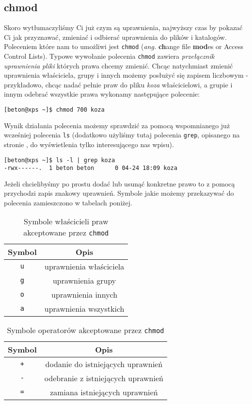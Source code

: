 \subsection{chmod}
\label{sec:chmod}
Skoro wytłumaczyliśmy Ci już czym są uprawnienia, najwyższy czas by pokazać Ci jak przyznawać, zmieniać i odbierać uprawnienia do plików i katalogów. Poleceniem które nam to umożliwi jest \texttt{chmod} (\textit{ang.} \textbf{ch}ange file \textbf{mod}es or Access Control Lists). Typowe wywołanie polecenia \texttt{chmod} zawiera \textit{przełącznik} \textit{uprawnienia} \textit{pliki} których prawa chcemy zmienić. Chcąc natychmiast zmienić uprawnienia właściciela, grupy i innych możemy posłużyć się zapisem liczbowym - przykładowo, chcąc nadać pełnie praw do pliku \textit{koza} właścicielowi, a grupie i innym odebrać wszystkie prawa wykonamy następujące polecenie:
\begin{verbatim}
[beton@xps ~]$ chmod 700 koza
\end{verbatim}
Wynik działania polecenia możemy sprawdzić za pomocą wspomnianego już wcześniej polecenia \texttt{ls} (dodatkowo użyliśmy tutaj polecenia \texttt{grep}, opisanego na stronie \pageref{sec:grep}, do wyświetlenia tylko interesującego nas wpisu).
\begin{verbatim}
[beton@xps ~]$ ls -l | grep koza
-rwx------.  1 beton beton      0 04-24 18:09 koza
\end{verbatim}
Jeżeli chcielibyśmy po prostu dodać lub usunąć konkretne prawo to z pomocą przychodzi zapis znakowy uprawnień. Symbole jakie możemy przekazywać do polecenia zamieszczono w tabelach poniżej.
\begin{table}[h!t!b]
\begin{center}
\begin{tabular}{|c|c|} \hline
Symbol & Opis \\ \hline
\texttt{u} & uprawnienia właściciela \\ \hline
\texttt{g} & uprawnienia grupy \\ \hline
\texttt{o} & uprawnienia innych \\ \hline
\texttt{a} & uprawnienia wszystkich \\ \hline
\end{tabular}
\caption{Symbole właścicieli praw akceptowane przez \texttt{chmod}}
\label{tab:chmod_symbole_wlasciciele}
\end{center}
\end{table}

\begin{table}[h!t!b]
\begin{center}
\begin{tabular}{|c|c|} \hline
Symbol & Opis \\ \hline
\texttt{+} & dodanie do istniejących uprawnień \\ \hline
\texttt{-} & odebranie z istniejących uprawnień \\ \hline
\texttt{=} & zamiana istniejących uprawnień \\ \hline
\end{tabular}
\caption{Symbole operatorów akceptowane przez \texttt{chmod}}
\label{tab:chmod_symbole_operatory}
\end{center}
\end{table}


